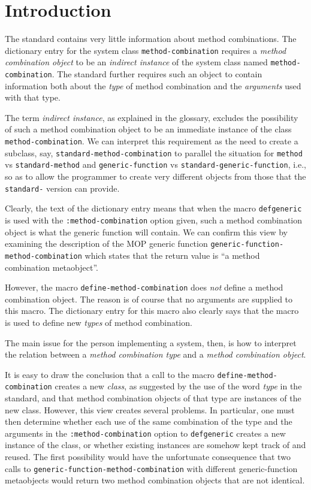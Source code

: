 \section{Introduction}

The \commonlisp{} standard contains very little information about
method combinations.  The dictionary entry for the system class
\texttt{method-combination} requires a \emph{method combination
  object} to be an \emph{indirect instance} of the system class named
\texttt{method-combination}.  The standard further requires such an
object to contain information both about the \emph{type} of method
combination and the \emph{arguments} used with that type.

The term \emph{indirect instance}, as explained in the glossary,
excludes the possibility of such a method combination object to be an
immediate instance of the class \texttt{method-combination}.  We can
interpret this requirement as the need to create a subclass, say,
\texttt{standard-method-combination} to parallel the situation for
\texttt{method} vs \texttt{standard-method} and
\texttt{generic-function} vs \texttt{standard-generic-function}, i.e.,
so as to allow the programmer to create very different objects from
those that the \texttt{standard-} version can provide.

Clearly, the text of the dictionary entry means that when the macro
\texttt{defgeneric} is used with the \texttt{:method-combination}
option given, such a method combination object is what the generic
function will contain.  We can confirm this view by examining the
description of the MOP generic function
\texttt{generic-function-method-combination} which states that the
return value is ``a method combination metaobject''.

However, the macro \texttt{define-method-combination} does \emph{not}
define a method combination object.  The reason is of course that no
arguments are supplied to this macro.  The dictionary entry for this
macro also clearly says that the macro is used to define new
\emph{types} of method combination.

The main issue for the person implementing a \commonlisp{} system,
then, is how to interpret the relation between a \emph{method
  combination type} and a \emph{method combination object}.

It is easy to draw the conclusion that a call to the macro
\texttt{define-method-combination} creates a new \emph{class}, as
suggested by the use of the word \emph{type} in the standard, and that
method combination objects of that type are instances of the new
class.  However, this view creates several problems.  In particular,
one must then determine whether each use of the same combination of
the type and the arguments in the \texttt{:method-combination} option
to \texttt{defgeneric} creates a new instance of the class, or whether
existing instances are somehow kept track of and reused.  The first
possibility would have the unfortunate consequence that two calls to
\texttt{generic-function-method-combination} with different
generic-function metaobjects would return two method combination
objects that are not identical.

